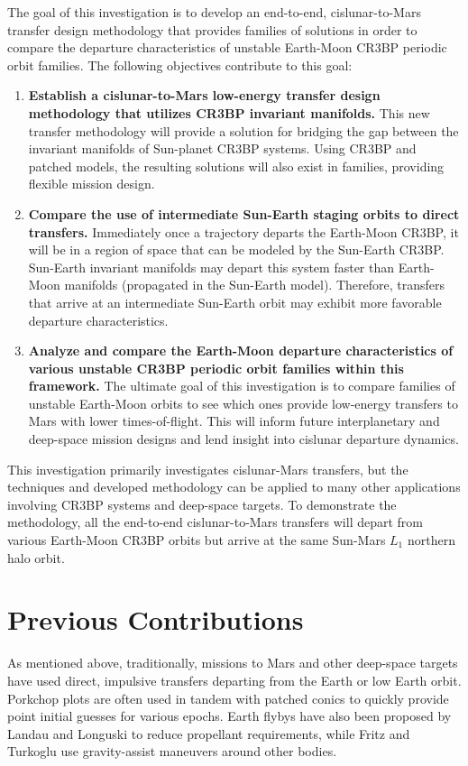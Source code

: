 The goal of this investigation is to develop an end-to-end, cislunar-to-Mars transfer design
methodology that provides families of solutions in order to compare the departure characteristics
of unstable Earth-Moon CR3BP periodic orbit families. The following objectives contribute to this
goal:
\begin{enumerate}
    \item   \textbf{Establish a cislunar-to-Mars low-energy transfer design methodology that
            utilizes CR3BP invariant manifolds.} This new transfer methodology will provide a
            solution for bridging the gap between the invariant manifolds of Sun-planet CR3BP
            systems. Using CR3BP and patched models, the resulting solutions will also exist in
            families, providing flexible mission design.
    \item   \textbf{Compare the use of intermediate Sun-Earth staging orbits to direct transfers.}
            Immediately once a trajectory departs the Earth-Moon CR3BP, it will be in a region of
            space that can be modeled by the Sun-Earth CR3BP. Sun-Earth invariant manifolds may
            depart this system faster than Earth-Moon manifolds (propagated in the Sun-Earth
            model). Therefore, transfers that arrive at an intermediate Sun-Earth orbit may exhibit
            more favorable departure characteristics.
    \item   \textbf{Analyze and compare the Earth-Moon departure characteristics of various
            unstable CR3BP periodic orbit families within this framework.} The ultimate goal of
            this investigation is to compare families of unstable Earth-Moon orbits to see which
            ones provide low-energy transfers to Mars with lower times-of-flight. This will inform
            future interplanetary and deep-space mission designs and lend insight into cislunar
            departure dynamics.

\end{enumerate}
This investigation primarily investigates cislunar-Mars transfers, but the techniques and developed
methodology can be applied to many other applications involving CR3BP systems and deep-space
targets. To demonstrate the methodology, all the end-to-end cislunar-to-Mars transfers will depart
from various Earth-Moon CR3BP orbits but arrive at the same Sun-Mars $L_{1}$ northern halo orbit.

\section{Previous Contributions}
As mentioned above, traditionally, missions to Mars and other deep-space targets have used direct,
impulsive transfers departing from the Earth or low Earth orbit. Porkchop plots are often used in
tandem with patched conics to quickly provide point initial guesses for various
epochs\cite{Drake:2009}. Earth flybys have also been proposed by Landau and Longuski to reduce
propellant requirements\cite{Landau:2006}, while Fritz and Turkoglu use gravity-assist maneuvers
around other bodies\cite{Fritz:2016}.

